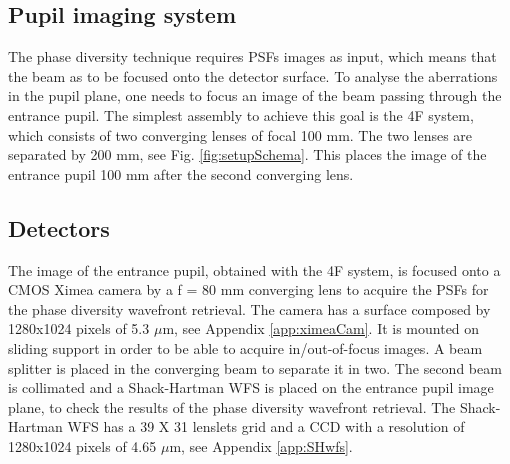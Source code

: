 \subsection{Pupil imaging system}
\label{subsec:pupilImSystem}

The phase diversity technique requires PSFs images as input, which means that the beam as to be focused onto the detector surface. To analyse the aberrations in the pupil plane, one needs to focus an image of the beam passing through the entrance pupil. The simplest assembly to achieve this goal is the 4F system, which consists of two converging lenses of focal 100 mm. The two lenses are separated by 200 mm, see Fig. \ref{fig:setupSchema}. This places the image of the entrance pupil 100 mm after the second converging lens.

\subsection{Detectors}
\label{subsec:Detectors}

The image of the entrance pupil, obtained with the 4F system, is focused onto a CMOS Ximea camera by a f = 80 mm converging lens to acquire the PSFs for the phase diversity wavefront retrieval. The camera has a surface composed by 1280x1024 pixels of 5.3 $\mu$m, see Appendix \ref{app:ximeaCam}. It is mounted on sliding support in order to be able to acquire in/out-of-focus images. A beam splitter is placed in the converging beam to separate it in two. The second beam is collimated and a Shack-Hartman WFS is placed on the entrance pupil image plane, to check the results of the phase diversity wavefront retrieval. The Shack-Hartman WFS has a 39 X 31 lenslets grid and a CCD with a resolution of 1280x1024 pixels of 4.65 $\mu$m, see Appendix \ref{app:SHwfs}. 

